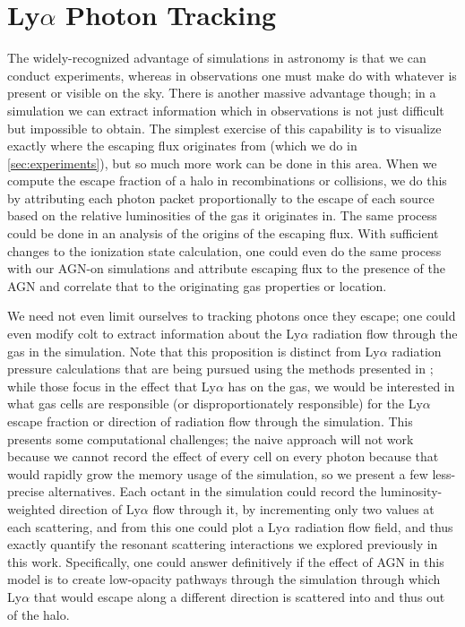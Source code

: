\section{Ly\texorpdfstring{$\alpha$}{a} Photon Tracking}
The widely-recognized advantage of simulations in astronomy is that we can conduct experiments, whereas in observations one must make do with whatever is present or visible on the sky.
There is another massive advantage though; in a simulation we can extract information which in observations is not just difficult but impossible to obtain.
The simplest exercise of this capability is to visualize exactly where the escaping flux originates from (which we do in \ref{sec:experiments}), but so much more work can be done in this area.
When we compute the escape fraction of a halo in recombinations or collisions, we do this by attributing each photon packet proportionally to the escape of each source based on the relative luminosities of the gas it originates in.
The same process could be done in an analysis of the origins of the escaping flux.
With sufficient changes to the ionization state calculation, one could even do the same process with our AGN-on simulations and attribute escaping flux to the presence of the AGN and correlate that to the originating gas properties or location.

We need not even limit ourselves to tracking photons once they escape; one could even modify {\sc colt} to extract information about the Ly$\alpha$ radiation flow through the gas in the simulation.
Note that this proposition is distinct from Ly$\alpha$ radiation pressure calculations that are being pursued using the methods presented in \citet{Smith2018}; while those focus in the effect that Ly$\alpha$ has on the gas, we would be interested in what gas cells are responsible (or disproportionately responsible) for the Ly$\alpha$ escape fraction or direction of radiation flow through the simulation.
This presents some computational challenges; the naive approach will not work because we cannot record the effect of every cell on every photon because that would rapidly grow the memory usage of the simulation, so we present a few less-precise alternatives.
Each octant in the simulation could record the luminosity-weighted direction of Ly$\alpha$ flow through it, by incrementing only two values at each scattering, and from this one could plot a Ly$\alpha$ radiation flow field, and thus exactly quantify the resonant scattering interactions we explored previously in this work.
Specifically, one could answer definitively if the effect of AGN in this model is to create low-opacity pathways through the simulation through which Ly$\alpha$ that would escape along a different direction is scattered into and thus out of the halo.


